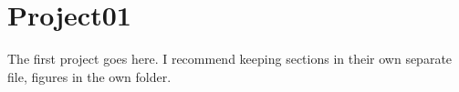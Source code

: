 \chapter{Project01}
\label{Proj:Proj01}

The first project goes here.  I recommend keeping sections in their own separate file, figures in the own folder.
